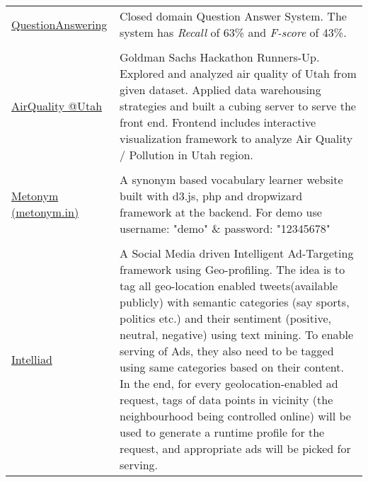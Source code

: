 \documentclass[8pt]{article}
\begin{document}
\begin{tabular}[t]{@{}p{\textwidth-\rcollength-130pt}p{\rcollength+130pt}}
       \\ 
        \href{https://github.com/debjyoti385/QuestionAnswerNLP}{QuestionAnswering} & \hspace{0.5cm}  Closed domain Question Answer System. The system has \emph{Recall} of  63\% and \emph{F-score} of 43\%.   \\
       \\ 
        \href{http://debjyoti385.github.io/AirQuality/}{AirQuality @Utah } & \hspace{0.5cm} Goldman Sachs Hackathon Runners-Up. Explored and analyzed air quality of Utah from given dataset. Applied data warehousing strategies and built a cubing server to serve the front end. Frontend includes interactive visualization framework to analyze Air Quality / Pollution in Utah region.  \\
       \\ 
    \href{http://metonym.in}{Metonym (metonym.in)} & \hspace{0.5cm} A synonym based vocabulary learner website built with d3.js, php and dropwizard framework at the backend. For demo use username: "demo" \& password: "12345678"  \\
       \\ 
    \href{http://github.com/debjyoti385/intelliad}{Intelliad} & \hspace{0.5cm}  A Social Media driven Intelligent Ad-Targeting framework using Geo-profiling. The idea is to tag all geo-location enabled tweets(available publicly) with semantic categories (say sports, politics etc.) and their sentiment (positive, neutral, negative) using text mining. To enable serving of Ads, they also need to be tagged using same categories based on their content. In the end, for every geolocation-enabled ad request, tags of data points in vicinity (the neighbourhood being controlled online) will be used to generate a runtime profile for the request, and appropriate ads will be picked for serving.  \\
\end{tabular}
\end{document}
